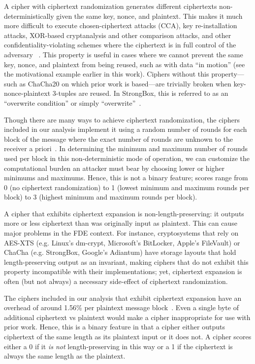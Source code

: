 A cipher with ciphertext randomization generates different ciphertexts
non-deterministically given the same key, nonce, and plaintext. This makes it
much more difficult to execute chosen-ciphertext attacks (CCA), key
re-installation attacks, XOR-based cryptanalysis and other comparison attacks,
and other confidentiality-violating schemes where the ciphertext is in full
control of the adversary ~\cite{Freestyle}. This property is useful in cases
where we cannot prevent the same key, nonce, and plaintext from being reused,
such as with data ``in motion'' (see the motivational example earlier in this
work). Ciphers without this property---such as ChaCha20 on which prior work is
based---are trivially broken when key-nonce-plaintext 3-tuples are reused. In
StrongBox, this is referred to as an ``overwrite condition'' or simply
``overwrite''~\cite{StrongBox}.

Though there are many ways to achieve ciphertext randomization, the ciphers
included in our analysis implement it using a random number of rounds for each
block of the message where the exact number of rounds are unknown to the
receiver a priori~\cite{Freestyle}. In determining the minimum and maximum
number of rounds used per block in this non-deterministic mode of operation, we
can customize the computational burden an attacker must bear by choosing lower
or higher minimums and maximums. Hence, this is not a binary feature; scores
range from 0 (no ciphertext randomization) to 1 (lowest minimum and maximum
rounds per block) to 3 (highest minimum and maximum rounds per block).

A cipher that exhibits ciphertext expansion is non-length-preserving: it outputs
more or less ciphertext than was originally input as plaintext. This can cause
major problems in the FDE context. For instance, cryptosystems that rely on
AES-XTS (e.g. Linux's dm-crypt, Microsoft's BitLocker, Apple's FileVault) or
ChaCha (e.g. StrongBox, Google's Adiantum) have storage layouts that hold
length-preserving output as an invariant, making ciphers that do not exhibit
this property incompatible with their implementations; yet, ciphertext expansion
is often (but not always) a necessary side-effect of ciphertext randomization.

The ciphers included in our analysis that exhibit ciphertext expansion have an
overhead of around 1.56\% per plaintext message block~\cite{Freestyle}. Even a
single byte of additional ciphertext vs plaintext would make a cipher
inappropriate for use with prior work. Hence, this is a binary feature in that a
cipher either outputs ciphertext of the same length as its plaintext input or it
does not. A cipher scores either a 0 if it \emph{is not} length-preserving in
this way or a 1 if the ciphertext is always the same length as the plaintext.




